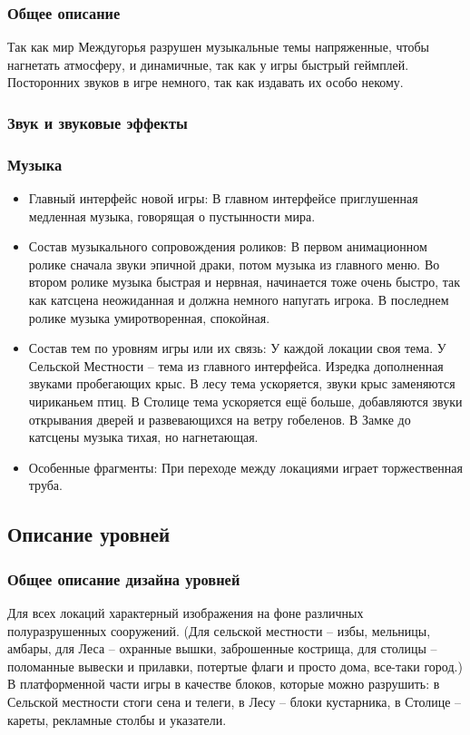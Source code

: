 \documentclass{article}
\begin{document}
\subsubsection{Общее описание}
Так как мир Междугорья разрушен музыкальные темы напряженные, чтобы нагнетать атмосферу, и динамичные, так как у игры быстрый геймплей. Посторонних звуков в игре немного, так как издавать их особо некому.

\subsubsection{Звук и звуковые эффекты}


\subsubsection{Музыка}
\begin{itemize}
    \item Главный интерфейс новой игры: В главном интерфейсе приглушенная медленная музыка, говорящая о пустынности мира.
    \item Состав музыкального сопровождения роликов: В первом анимационном ролике сначала звуки эпичной драки, потом музыка из главного меню.
    Во втором ролике музыка быстрая и нервная, начинается тоже очень быстро, так как катсцена неожиданная и должна немного напугать игрока.
    В последнем ролике музыка умиротворенная, спокойная.
    \item Состав тем по уровням игры или их связь: У каждой локации своя тема. У Сельской Местности – тема из главного интерфейса. Изредка дополненная звуками пробегающих крыс. В лесу тема ускоряется, звуки крыс заменяются чириканьем птиц. В Столице тема ускоряется ещё больше, добавляются звуки открывания дверей и развевающихся на ветру гобеленов. В Замке до катсцены музыка тихая, но нагнетающая.
    \item Особенные фрагменты: При переходе между локациями играет торжественная труба. 
\end{itemize}

\subsection{Описание уровней}
\subsubsection{Общее описание дизайна уровней}
Для всех локаций характерный изображения на фоне различных полуразрушенных сооружений.
(Для сельской местности – избы, мельницы, амбары, для Леса – охранные вышки, заброшенные кострища, для столицы – поломанные вывески и прилавки, потертые флаги и просто дома, все-таки город.)
В платформенной части игры в качестве блоков, которые можно разрушить: в Сельской местности стоги сена и телеги, в Лесу – блоки кустарника, в Столице – кареты, рекламные столбы и указатели.
\end{document}
